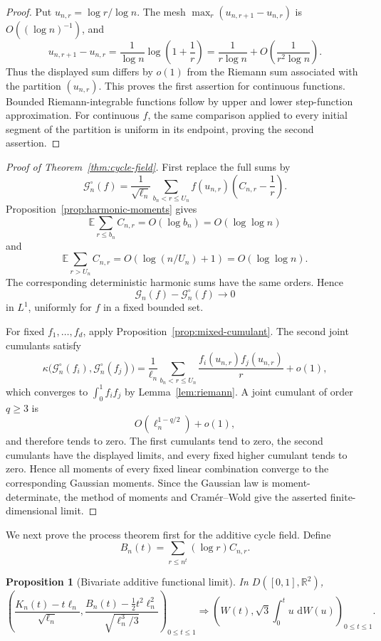 \documentclass[11pt]{article}
\newtheorem{proposition}[theorem]{Proposition}
\theoremstyle{definition}
\theoremstyle{remark}
\newcommand{\Ee}{\mathbb E}
\newcommand{\dd}{\,\mathrm d}
\newcommand{\cG}{\mathcal G}
\newcommand{\R}{\mathbb R}
\begin{document}
\begin{proof}
Put $u_{n,r}=\log r/\log n$.  The mesh
$\max_r(u_{n,r+1}-u_{n,r})$ is $O((\log n)^{-1})$, and
\[
 u_{n,r+1}-u_{n,r}
 =
 \frac1{\log n}\log\left(1+\frac1r\right)
 =
 \frac1{r\log n}+O\left(\frac1{r^2\log n}\right).
\]
Thus the displayed sum differs by $o(1)$ from the Riemann sum associated
with the partition $(u_{n,r})$.  This proves the first assertion for
continuous functions.  Bounded Riemann-integrable functions follow by
upper and lower step-function approximation.  For continuous $f$, the
same comparison applied to every initial segment of the partition is
uniform in its endpoint, proving the second assertion.
\end{proof}

\begin{proof}[Proof of Theorem~\ref{thm:cycle-field}]
First replace the full sums by
\[
 \cG_n^\circ(f)
 =
 \frac1{\sqrt{\ell_n}}
 \sum_{b_n<r\le U_n}
 f(u_{n,r})\left(C_{n,r}-\frac1r\right).
\]
Proposition~\ref{prop:harmonic-moments} gives
\[
 \Ee\sum_{r\le b_n}C_{n,r}=O(\log b_n)=O(\log\log n)
\]
and
\[
 \Ee\sum_{r>U_n}C_{n,r}
 =O(\log(n/U_n)+1)=O(\log\log n).
\]
The corresponding deterministic harmonic sums have the same orders.
Hence
\[
 \cG_n(f)-\cG_n^\circ(f)\longrightarrow0
\]
in $L^1$, uniformly for $f$ in a fixed bounded set.

For fixed $f_1,\ldots,f_d$, apply
Proposition~\ref{prop:mixed-cumulant}.  The second joint cumulants satisfy
\[
 \kappa\bigl(\cG_n^\circ(f_i),\cG_n^\circ(f_j)\bigr)
 =
 \frac1{\ell_n}
 \sum_{b_n<r\le U_n}
 \frac{f_i(u_{n,r})f_j(u_{n,r})}{r}
 +o(1),
\]
which converges to $\int_0^1f_i f_j$ by
Lemma~\ref{lem:riemann}.  A joint cumulant of order $q\ge3$ is
\[
 O(\ell_n^{1-q/2})+o(1),
\]
and therefore tends to zero.  The first cumulants tend to zero, the second cumulants have the displayed
limits, and every fixed higher cumulant tends to zero.  Hence all moments
of every fixed linear combination converge to the corresponding Gaussian
moments.  Since the Gaussian law is moment-determinate, the method of
moments and Cram\'er--Wold give the asserted finite-dimensional limit.
\end{proof}

We next prove the process theorem first for the additive cycle field.
Define
\[
 B_n(t)=\sum_{r\le n^t}(\log r)C_{n,r}.
\]

\begin{proposition}[Bivariate additive functional limit]
\label{prop:additive-functional}
In $D([0,1],\R^2)$,
\[
 \left(
 \frac{K_n(t)-t\ell_n}{\sqrt{\ell_n}},
 \frac{B_n(t)-\frac12t^2\ell_n^2}{\sqrt{\ell_n^3/3}}
 \right)_{0\le t\le1}
 \Rightarrow
 \left(
 W(t),\sqrt3\int_0^t u\,\dd W(u)
 \right)_{0\le t\le1}.
\]
\end{proposition}
\end{document}
